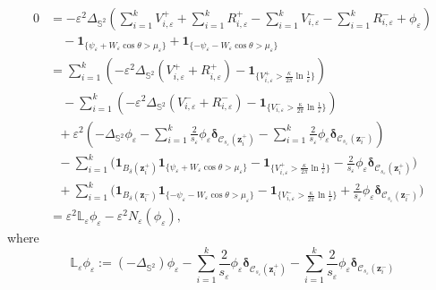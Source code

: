 \documentclass[12pt,reqno]{amsart}
\numberwithin{equation}{section}
\theoremstyle{definition}
\theoremstyle{remark}
\begin{document}
	\begin{align*}
			0&=-\varepsilon^2\Delta_{\mathbb S^2}\left(\sum\limits_{i=1}^kV^+_{i,\varepsilon}+\sum\limits_{i=1}^kR^+_{i,\varepsilon}-\sum\limits_{i=1}^kV^-_{i,\varepsilon}-\sum\limits_{i=1}^kR^-_{i,\varepsilon}+\phi_\varepsilon\right)\\
			&\quad-\boldsymbol1_{\{\psi_\varepsilon+W_\varepsilon\cos\theta>\mu_\varepsilon\}}+\boldsymbol1_{\{-\psi_\varepsilon-W_\varepsilon\cos\theta>\mu_\varepsilon\}}\\
			&=\sum\limits_{i=1}^k\left(-\varepsilon^2\Delta_{\mathbb S^2}\left(V^+_{i,\varepsilon}+R^+_{i,\varepsilon}\right)-\boldsymbol1_{\{V^+_{i,\varepsilon}>\frac{\kappa}{2\pi}\ln\frac{1}{\varepsilon}\}}\right)\\
			&\quad -\sum\limits_{i=1}^k\left(-\varepsilon^2\Delta_{\mathbb S^2}\left(V^-_{i,\varepsilon}+R^-_{i,\varepsilon}\right)-\boldsymbol1_{\{V^-_{i,\varepsilon}>\frac{\kappa}{2\pi}\ln\frac{1}{\varepsilon}\}}\right)\\
			& \ \ \ +\varepsilon^2\left(-\Delta_{\mathbb S^2}\phi_\varepsilon-\sum\limits_{i=1}^k\frac{2}{s_\varepsilon}\phi_\varepsilon\boldsymbol\delta_{\mathcal C_{s_\varepsilon}(\boldsymbol z_i^+)}-\sum\limits_{i=1}^k\frac{2}{s_\varepsilon}\phi_\varepsilon\boldsymbol\delta_{\mathcal C_{s_\varepsilon}(\boldsymbol z_i^-)}\right)\\
			& \ \ \ -\sum\limits_{i=1}^k\bigg(\boldsymbol1_{ B_\delta(\boldsymbol z_i^+)}\boldsymbol1_{\{\psi_\varepsilon+W_\varepsilon\cos\theta>\mu_\varepsilon\}}-\boldsymbol1_{\{V_{i,\varepsilon}^+>\frac{\kappa}{2\pi}\ln\frac{1}{\varepsilon}\}}-\frac{2}{s_\varepsilon}\phi_\varepsilon\boldsymbol\delta_{\mathcal C_{s_\varepsilon}(\boldsymbol z_i^+)}\bigg)\\
			& \ \ \ +\sum\limits_{i=1}^k\bigg(\boldsymbol1_{ B_\delta(\boldsymbol z_i^-)}\boldsymbol1_{\{-\psi_\varepsilon-W_\varepsilon\cos\theta>\mu_\varepsilon\}}-\boldsymbol1_{\{V_{i,\varepsilon}^->\frac{\kappa}{2\pi}\ln\frac{1}{\varepsilon}\}}+\frac{2}{s_\varepsilon}\phi_\varepsilon\boldsymbol\delta_{\mathcal C_{s_\varepsilon}(\boldsymbol z_i^-)}\bigg)\\
			&=\varepsilon^2\mathbb L_\varepsilon\phi_\varepsilon-\varepsilon^2N_\varepsilon(\phi_\varepsilon),
	\end{align*}
	where
	\begin{equation*}
		\mathbb L_\varepsilon\phi_\varepsilon:=(-\Delta_{\mathbb S^2})\phi_\varepsilon-\sum\limits_{i=1}^k\frac{2}{s_\varepsilon}\phi_\varepsilon\boldsymbol\delta_{\mathcal C_{s_\varepsilon}(\boldsymbol z_i^+)}-\sum\limits_{i=1}^k\frac{2}{s_\varepsilon}\phi_\varepsilon\boldsymbol\delta_{\mathcal C_{s_\varepsilon}(\boldsymbol z_i^-)}
	\end{equation*}
\end{document}
